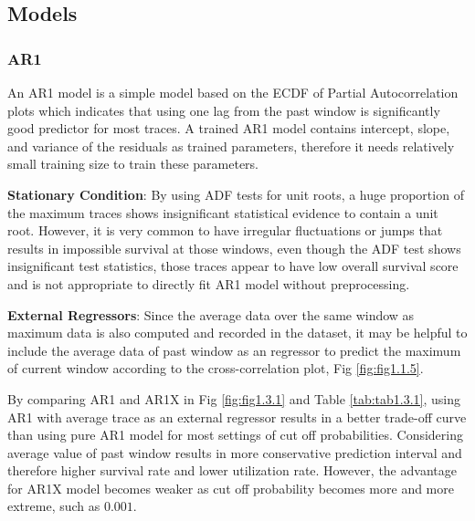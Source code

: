 \documentclass{article}
\begin{document}
\subsection{Models}

\subsubsection{AR1}

\begin{flushleft}
An AR1 model is a simple model based on the ECDF of Partial Autocorrelation
plots which indicates that using one lag from the past window is significantly
good predictor for most traces. A trained AR1 model contains intercept, slope,
and variance of the residuals as trained parameters, therefore it needs
relatively small training size to train these parameters. 
\end{flushleft}

\begin{flushleft}
\textbf{Stationary Condition}: By using ADF tests for unit roots, a huge
proportion of the maximum traces shows insignificant statistical evidence to
contain a unit root. However, it is very common to have irregular fluctuations
or jumps that results in impossible survival at those windows, even though the
ADF test shows insignificant test statistics, those traces appear to have low
overall survival score and is not appropriate to directly fit AR1 model without
preprocessing.
\end{flushleft}

\begin{flushleft}
\textbf{External Regressors}: Since the average data over the same window as
maximum data is also computed and recorded in the dataset, it may be helpful to
include the average data of past window as an regressor to predict the maximum
of current window according to the cross-correlation plot, Fig
\ref{fig:fig1.1.5}.

By comparing AR1 and AR1X in Fig \ref{fig:fig1.3.1} and Table
\ref{tab:tab1.3.1}, using AR1 with average trace as an external regressor
results in a better trade-off curve than using pure AR1 model for most settings
of cut off probabilities. Considering average value of past window results in
more conservative prediction interval and therefore higher survival rate and
lower utilization rate. However, the advantage for AR1X model becomes weaker as
cut off probability becomes more and more extreme, such as $0.001$.
\end{flushleft}
\end{document}

